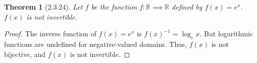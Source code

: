 \documentclass[a4paper, 12pt]{article}
\theoremstyle{plain}
\newtheorem*{theorem*}{Theorem}
\begin{document}
	
	\begin{theorem*}[2.3.24]
		Let $f$ be the function $f: \mathbb{R} \implies \mathbb{R}$ defined by $f(x) = e^{x}$. $f(x)$ is not invertible.
	\end{theorem*}
	
	\begin{proof}
		The inverse function of $f(x) = e^{x}$ is $f(x)^{-1} = \log_{e}x$. But \newline logarithmic functions are undefined for negative-valued domains. Thus, $f(x)$ is not bijective, and $f(x)$ is not invertible.
	\end{proof}
\end{document}
